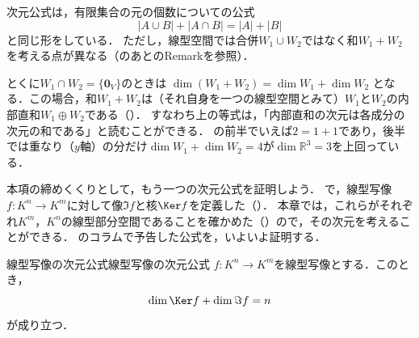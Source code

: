 \begin{remark}[次元公式の読み方]
  次元公式は，有限集合の元の個数についての公式
  \[
    |A \cup B| + |A \cap B| = |A| + |B|
  \]
  と同じ形をしている．
  ただし，線型空間では合併$W_1 \cup W_2$ではなく和$W_1 + W_2$を考える点が異なる（のあとのRemarkを参照）．

  とくに$W_1 \cap W_2 = \{\bm{0}_V\}$のときは
  $\dim(W_1 + W_2) = \dim W_1 + \dim W_2$
  となる．この場合，和$W_1 + W_2$は（それ自身を一つの線型空間とみて）$W_1$と$W_2$の内部直和$W_1 \oplus W_2$である（）．
  すなわち上の等式は，「内部直和の次元は各成分の次元の和である」と読むことができる．
  の前半でいえば$2=1+1$であり，後半では重なり（$y$軸）の分だけ$\dim W_1+\dim W_2=4$が$\dim\mathbb{R}^3=3$を上回っている．
\end{remark}

本項の締めくくりとして，もう一つの次元公式を証明しよう．
で，線型写像$f \colon K^n \to K^m$に対して像$\Im f$と核$\Ker f$を定義した（）．
本章では，これらがそれぞれ$K^m$，$K^n$の線型部分空間であることを確かめた（）ので，その次元を考えることができる．
のコラムで予告した公式を，いよいよ証明する．

\begin{theorem}{線型写像の次元公式}{線型写像の次元公式}
  $f \colon K^n \to K^m$を線型写像とする．このとき，
  \[
    \dim \Ker f + \dim \Im f = n
  \]
  が成り立つ．
\end{theorem}

